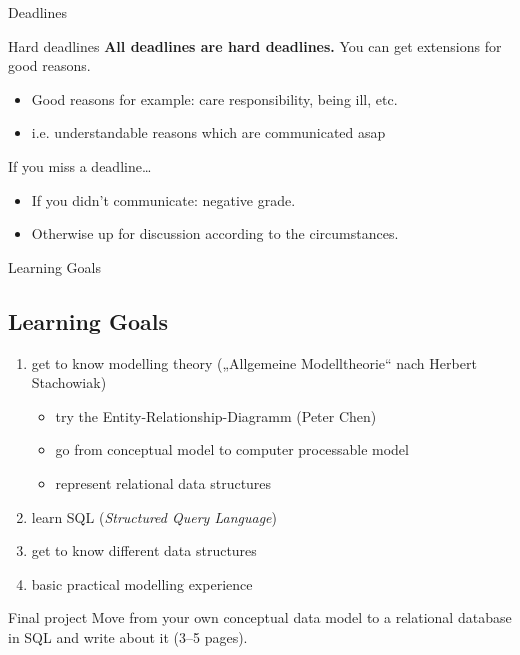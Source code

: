 \begin{frame}{Deadlines}

\begin{alertblock}{Hard deadlines}\small
\textbf{All deadlines are hard deadlines.} 
You can get extensions for good reasons.
\begin{itemize}
\item Good reasons for example: care responsibility, being ill, etc.
\item i.e. understandable reasons which are communicated asap
\end{itemize}
\end{alertblock}

\begin{alertblock}{If you miss a deadline\dots}
\begin{itemize}\small
\item If you didn’t communicate: negative grade.
\item Otherwise up for discussion according to the circumstances.
\end{itemize}
\end{alertblock}

\end{frame}
\begin{frame}{Learning Goals}
\subsection{Learning Goals}
\begin{enumerate}
    \item get to know modelling theory („Allgemeine Modelltheorie“ nach Herbert Stachowiak)
    \begin{itemize}
        \item try the Entity-Relationship-Diagramm (Peter Chen)
        \item go from conceptual model to computer processable model
        \item represent relational data structures
    \end{itemize}
    \item learn SQL (\emph{Structured Query Language})
    \item get to know different data structures 
    \item basic practical modelling experience
\end{enumerate}

\begin{alertblock}{Final project}
\footnotesize
Move from your own conceptual data model to a relational database in SQL and write about it (3--5 pages). 

\end{alertblock}
\end{frame}

